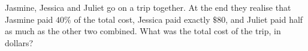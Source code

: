 Jasmine, Jessica and Juliet go on a trip together. At the end they realise that Jasmine paid $40\%$ of the total cost, Jessica paid exactly $\$80$, and Juliet paid half as much as the other two combined. What was the total cost of the trip, in dollars?
